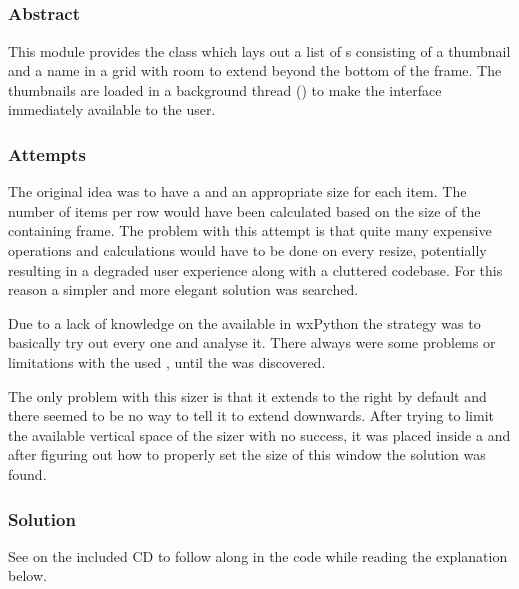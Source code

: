 \subsection{}
\label{subsec:mod:itemview}
\def\kapitelautor{Clemens Stadlbauer}

\subsubsection{Abstract}
This module provides the  class which lays out a list of
s consisting of a thumbnail and a name in a grid with room to
extend beyond the bottom of the frame. The thumbnails are loaded in a
background thread () to make the interface immediately
available to the user.

\subsubsection{Attempts}
The original idea was to have a  \cite{wxGridSizer} and an
appropriate size for each item. The number of items per row would have been
calculated based on the size of the containing frame. The problem with this
attempt is that quite many expensive operations and calculations would have to
be done on every resize, potentially resulting in a degraded user experience
along with a cluttered codebase. For this reason a simpler and more elegant
solution was searched.

Due to a lack of knowledge on the available  in
wxPython the strategy was to basically try out every one and
analyse it. There always were some problems or limitations with the used
, until the  \cite{wxWrapSizer} was
discovered.

The only problem with this sizer is that it extends to the right by default
and there seemed to be no way to tell it to extend downwards. After trying
to limit the available vertical space of the sizer with no success, it was
placed inside a  \cite{wxScrolledWindow} and after
figuring out how to properly set the size of this window the solution was found.

\subsubsection{Solution} %

See  on the included CD to 
follow along in the code while reading the explanation below.

